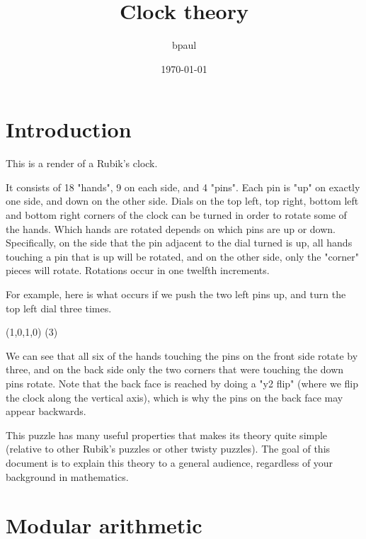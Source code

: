 \documentclass{article}
\title{Clock theory}
\author{bpaul}
\date{\today}
\begin{document}


\maketitle

\section{Introduction}
This is a render of a Rubik's clock.

\drawclock

It consists of 18 "hands", 9 on each side, and 4 "pins".
Each pin is "up" on exactly one side, and down on the other side.
Dials on the top left, top right, bottom left and bottom right corners of the clock can be turned in order to rotate some of the hands.
Which hands are rotated depends on which pins are up or down.
Specifically, on the side that the pin adjacent to the dial turned is up, all hands touching a pin that is up will be rotated, and on the other side, only the "corner" pieces will rotate.
Rotations occur in one twelfth increments.

For example, here is what occurs if we push the two left pins up, and turn the top left dial three times.

\setpins(1,0,1,0)
\move(3)

\drawclock

We can see that all six of the hands touching the pins on the front side rotate by three, and on the back side only the two corners that were touching the down pins rotate.
Note that the back face is reached by doing a "y2 flip" (where we flip the clock along the vertical axis), which is why the pins on the back face may appear backwards.

This puzzle has many useful properties that makes its theory quite simple (relative to other Rubik's puzzles or other twisty puzzles).
The goal of this document is to explain this theory to a general audience, regardless of your background in mathematics.

\tableofcontents

\section{Modular arithmetic}














%






\end{document}

